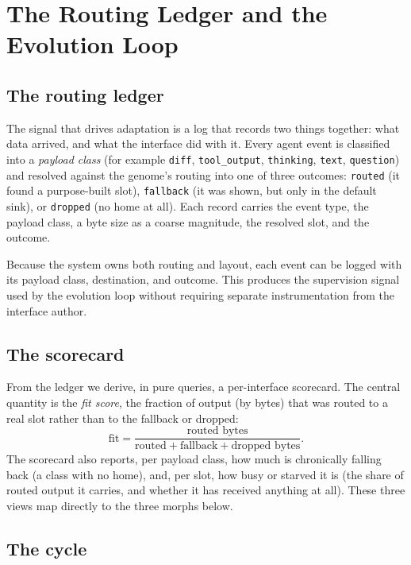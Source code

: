 \documentclass[11pt]{article}
\begin{document}
\section{The Routing Ledger and the Evolution Loop}
\label{sec:loop}

\subsection{The routing ledger}

The signal that drives adaptation is a log that records two things together: what
data arrived, and what the interface did with it. Every agent event is classified
into a \emph{payload class} (for example \texttt{diff}, \texttt{tool\_output},
\texttt{thinking}, \texttt{text}, \texttt{question}) and resolved against the
genome's routing into one of three outcomes: \texttt{routed} (it found a
purpose-built slot), \texttt{fallback} (it was shown, but only in the default
sink), or \texttt{dropped} (no home at all). Each record carries the event type,
the payload class, a byte size as a coarse magnitude, the resolved slot, and the
outcome.

Because the system owns both routing and layout, each event can be logged with
its payload class, destination, and outcome. This produces the supervision signal
used by the evolution loop without requiring separate instrumentation from the
interface author.

\subsection{The scorecard}

From the ledger we derive, in pure queries, a per-interface scorecard. The
central quantity is the \emph{fit score}, the fraction of output (by bytes) that
was routed to a real slot rather than to the fallback or dropped:
\[
  \mathrm{fit} = \frac{\text{routed bytes}}{\text{routed} + \text{fallback} + \text{dropped bytes}}.
\]
The scorecard also reports, per payload class, how much is chronically falling
back (a class with no home), and, per slot, how busy or starved it is (the share
of routed output it carries, and whether it has received anything at all). These
three views map directly to the three morphs below.

\subsection{The cycle}
\end{document}
